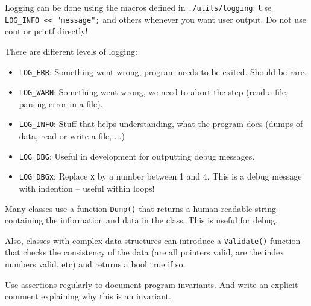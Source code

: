 \documentclass[a4paper,10pt]{article}
\begin{document}
Logging can be done using the macros defined in \verb|./utils/logging|: Use \verb|LOG_INFO << "message";| and others whenever you want user output. Do not use cout or printf directly!

There are different levels of logging:
\begin{itemize}
    \item \verb|LOG_ERR|: Something went wrong, program needs to be exited. Should be rare.
    \item \verb|LOG_WARN|: Something went wrong, we need to abort the step (read a file, parsing error in a file).
    \item \verb|LOG_INFO|: Stuff that helps understanding, what the program does (dumps of data, read or write a file, ...)
    \item \verb|LOG_DBG|: Useful in development for outputting debug messages.
    \item \verb|LOG_DBGx|: Replace \verb|x| by a number between 1 and 4. This is a debug message with indention -- useful within loops!
\end{itemize}

Many classes use a function \verb|Dump()| that returns a human-readable string containing the information and data in the class. This is useful for debug.

Also, classes with complex data structures can introduce a \verb|Validate()| function that checks the consistency of the data (are all pointers valid, are the index numbers valid, etc) and returns a bool true if so.

Use assertions regularly to document program invariants. And write an explicit comment explaining why this is an invariant.

% 


% 

\end{document}
